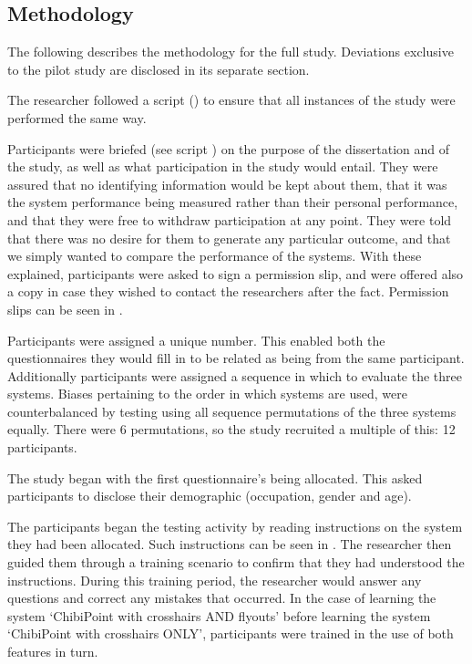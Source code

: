 \documentclass[11pt,openright,a4paper]{report}
\begin{document}
\subsection{Methodology}
The following describes the methodology for the full study. Deviations exclusive to the pilot study are disclosed in its separate section.

The researcher followed a script () to ensure that all instances of the study were performed the same way.

Participants were briefed (see script ) on the purpose of the dissertation and of the study, as well as what participation in the study would entail. They were assured that no identifying information would be kept about them, that it was the system performance being measured rather than their personal performance, and that they were free to withdraw participation at any point. They were told that there was no desire for them to generate any particular outcome, and that we simply wanted to compare the performance of the systems. With these explained, participants were asked to sign a permission slip, and were offered also a copy in case they wished to contact the researchers after the fact. Permission slips can be seen in .

Participants were assigned a unique number. This enabled both the questionnaires they would fill in to be related as being from the same participant. Additionally participants were assigned a sequence in which to evaluate the three systems. Biases pertaining to the order in which systems are used, were counterbalanced by testing using all sequence permutations of the three systems equally. There were 6 permutations, so the study recruited a multiple of this: 12 participants.

The study began with the first questionnaire's being allocated. This asked participants to disclose their demographic (occupation, gender and age).

The participants began the testing activity by reading instructions on the system they had been allocated. Such instructions can be seen in . The researcher then guided them through a training scenario to confirm that they had understood the instructions. During this training period, the researcher would answer any questions and correct any mistakes that occurred. In the case of learning the system `ChibiPoint with crosshairs AND flyouts' before learning the system `ChibiPoint with crosshairs ONLY', participants were trained in the use of both features in turn.
\end{document}
